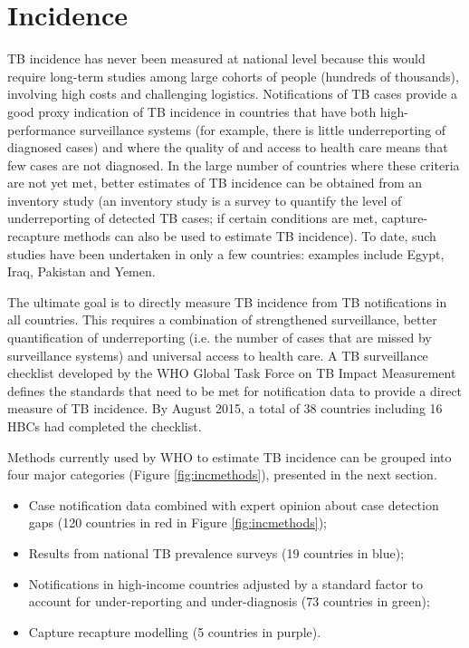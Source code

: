 \section{Incidence}

TB incidence has never been measured at national level because this would require long-term studies among large cohorts of people (hundreds of thousands), involving high costs and challenging logistics. Notifications of TB cases provide a good proxy indication of TB incidence in countries that have both high-performance surveillance systems (for example, there is little underreporting of diagnosed cases) and where the quality of and access to health care means that few cases are not diagnosed. In the large number of countries where these criteria are not yet met, better estimates of TB incidence can be obtained from an inventory study\cite{WHO2012} (an inventory study is a survey to quantify the level of underreporting of detected TB cases; if certain conditions are met, capture-recapture methods can also be used to estimate TB incidence). To date, such studies have been undertaken in only a few countries: examples include Egypt, Iraq, Pakistan and Yemen. 

The ultimate goal is to directly measure TB incidence from TB notifications in all countries. This requires a combination of strengthened surveillance, better quantification of underreporting (i.e. the number of cases that are missed by surveillance systems) and universal access to health care. A TB surveillance checklist developed by the WHO Global Task Force on TB Impact Measurement defines the standards that need to be met for notification data to provide a direct measure of TB incidence. By August 2015, a total of 38 countries including 16 HBCs had completed the checklist. 

Methods currently used by WHO to estimate TB incidence can be grouped into four major categories (Figure \ref{fig:incmethods}), presented in the next section. 

\begin{itemize}
\item Case notification data combined with expert opinion about case detection gaps (120 countries in red in Figure \ref{fig:incmethods});
\item Results from national TB prevalence surveys (19 countries in blue);
\item Notifications in high-income countries adjusted by a standard factor to account for under-reporting and under-diagnosis (73 countries in green);
\item Capture recapture modelling (5 countries in purple).
\end{itemize}






  
  
  
  
  
  
  
  
  
  